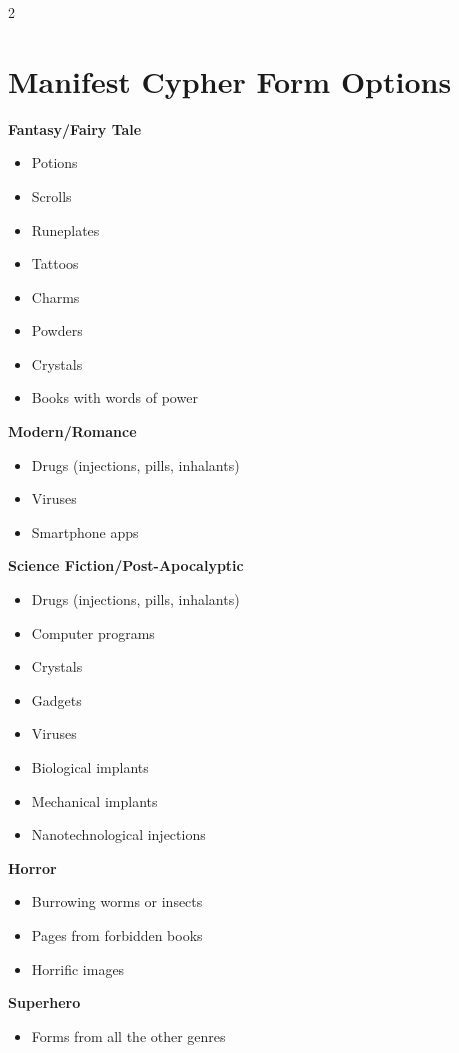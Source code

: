 \begin{multicols}{2}
\section{Manifest Cypher Form Options}

\textbf{Fantasy/Fairy Tale}

\begin{itemize}
\item Potions
\item Scrolls
\item Runeplates
\item Tattoos
\item Charms
\item Powders
\item Crystals
\item Books with words of power
\end{itemize}

\textbf{Modern/Romance}

\begin{itemize}
\item Drugs (injections, pills, inhalants)
\item Viruses
\item Smartphone apps
\end{itemize}

\textbf{Science Fiction/Post-Apocalyptic}

\begin{itemize}
\item Drugs (injections, pills, inhalants)
\item Computer programs
\item Crystals
\item Gadgets
\item Viruses
\item Biological implants
\item Mechanical implants
\item Nanotechnological injections
\end{itemize}

\textbf{Horror}

\begin{itemize}
\item Burrowing worms or insects
\item Pages from forbidden books
\item Horrific images
\end{itemize}

\textbf{Superhero}

\begin{itemize}
\item Forms from all the other genres
\end{itemize}

\newpage

\end{multicols}

